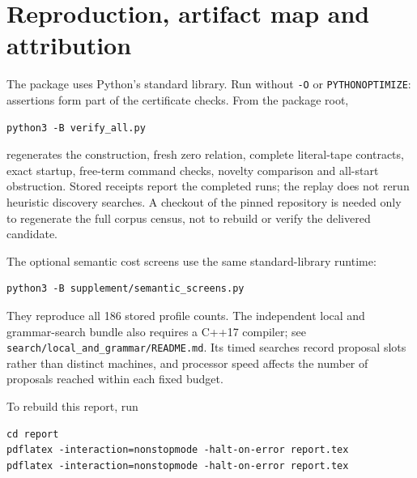 \documentclass[11pt,letterpaper]{article}
\newcommand{\file}[1]{\texttt{\nolinkurl{#1}}}
\begin{document}


\section{Reproduction, artifact map and attribution}

The package uses Python's standard library. Run without \texttt{-O} or
\texttt{PYTHONOPTIMIZE}: assertions form part of the certificate checks.
From the package root,
\begin{verbatim}
python3 -B verify_all.py
\end{verbatim}
regenerates the construction, fresh zero relation, complete literal-tape
contracts, exact startup, free-term command checks, novelty comparison
and all-start obstruction. Stored receipts report the completed runs;
the replay does not rerun heuristic discovery searches. A checkout of the
pinned repository is needed only to regenerate the full corpus census,
not to rebuild or verify the delivered candidate.

The optional semantic cost screens use the same standard-library runtime:
\begin{verbatim}
python3 -B supplement/semantic_screens.py
\end{verbatim}
They reproduce all 186 stored profile counts. The independent local and
grammar-search bundle also requires a C++17 compiler; see
\file{search/local_and_grammar/README.md}. Its timed searches record
proposal slots rather than distinct machines, and processor speed affects
the number of proposals reached within each fixed budget.

To rebuild this report, run
\begin{verbatim}
cd report
pdflatex -interaction=nonstopmode -halt-on-error report.tex
pdflatex -interaction=nonstopmode -halt-on-error report.tex
\end{verbatim}
\end{document}
